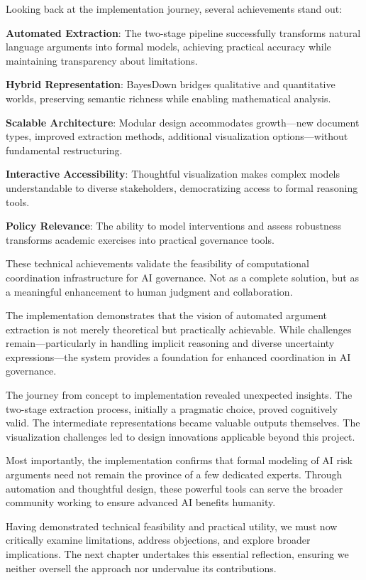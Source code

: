 \documentclass[
  11pt,
  letterpaper,
]{book}
\begin{document}
Looking back at the implementation journey, several achievements stand
out:

\textbf{Automated Extraction}: The two-stage pipeline successfully
transforms natural language arguments into formal models, achieving
practical accuracy while maintaining transparency about limitations.

\textbf{Hybrid Representation}: BayesDown bridges qualitative and
quantitative worlds, preserving semantic richness while enabling
mathematical analysis.

\textbf{Scalable Architecture}: Modular design accommodates growth---new
document types, improved extraction methods, additional visualization
options---without fundamental restructuring.

\textbf{Interactive Accessibility}: Thoughtful visualization makes
complex models understandable to diverse stakeholders, democratizing
access to formal reasoning tools.

\textbf{Policy Relevance}: The ability to model interventions and assess
robustness transforms academic exercises into practical governance
tools.

These technical achievements validate the feasibility of computational
coordination infrastructure for AI governance. Not as a complete
solution, but as a meaningful enhancement to human judgment and
collaboration.

The implementation demonstrates that the vision of automated argument
extraction is not merely theoretical but practically achievable. While
challenges remain---particularly in handling implicit reasoning and
diverse uncertainty expressions---the system provides a foundation for
enhanced coordination in AI governance.

The journey from concept to implementation revealed unexpected insights.
The two-stage extraction process, initially a pragmatic choice, proved
cognitively valid. The intermediate representations became valuable
outputs themselves. The visualization challenges led to design
innovations applicable beyond this project.

Most importantly, the implementation confirms that formal modeling of AI
risk arguments need not remain the province of a few dedicated experts.
Through automation and thoughtful design, these powerful tools can serve
the broader community working to ensure advanced AI benefits humanity.

Having demonstrated technical feasibility and practical utility, we must
now critically examine limitations, address objections, and explore
broader implications. The next chapter undertakes this essential
reflection, ensuring we neither oversell the approach nor undervalue its
contributions.
\end{document}
